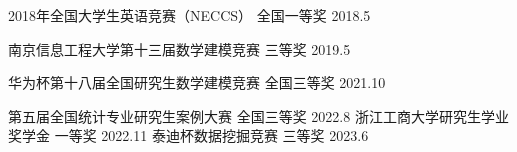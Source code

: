 



\begin{cvhonors}

  \cvhonor
    {2018年全国大学生英语竞赛（NECCS）} %
    {} %
    {全国一等奖} %
    {2018.5} %

  \cvhonor
    {南京信息工程大学第十三届数学建模竞赛} %
    {} %
    {三等奖} %
    {2019.5} %

\cvhonor
  {华为杯第十八届全国研究生数学建模竞赛} %
  {} %
  {全国三等奖} %
  {2021.10} %


  \cvhonor
    {第五届全国统计专业研究生案例大赛} %
    {} %
    {全国三等奖} %
    {2022.8} %
\cvhonor
  {浙江工商大学研究生学业奖学金} %
  {} %
  {一等奖} %
  {2022.11} %
\cvhonor
  {泰迪杯数据挖掘竞赛} %
  {} %
  {三等奖} %
  {2023.6} 


\end{cvhonors}




